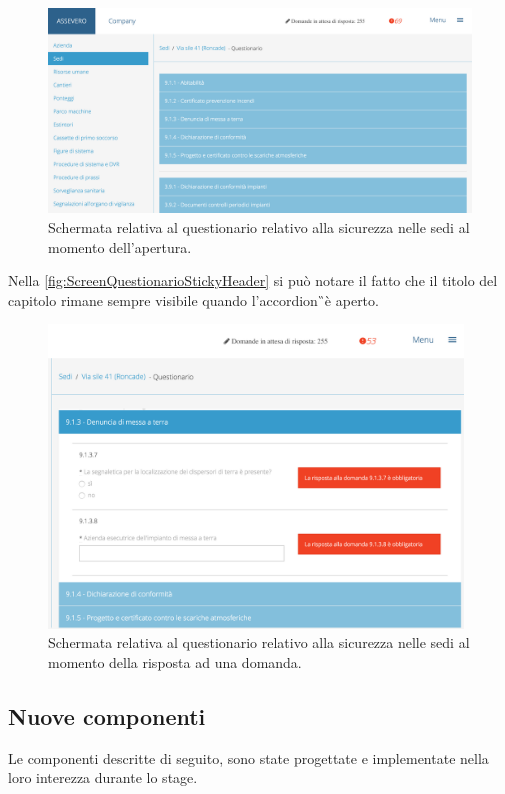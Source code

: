 \begin{figure}[H]
	\begin{center}
		\includegraphics[width=13cm]{Pics/ScreenQuestionarioSediApertura.png}
		\caption{Schermata relativa al questionario relativo alla sicurezza nelle sedi al momento dell'apertura.}
		\label{fig:ScreenQuestionarioSediApertura.png}
	\end{center}
\end{figure}
Nella \autoref{fig:ScreenQuestionarioStickyHeader} si può notare il fatto che il titolo del capitolo rimane sempre visibile quando l'\gls{accordion}\G\  è aperto.\\
\begin{figure}[H]
	\begin{center}
		\includegraphics[width=11cm]{Pics/ScreenQuestionarioStickyHeader.png}
		\caption{Schermata relativa al questionario relativo alla sicurezza nelle sedi al momento della risposta ad una domanda.}
		\label{fig:ScreenQuestionarioStickyHeader}
	\end{center}
\end{figure}

 


\newpage
\subsection{Nuove componenti}
Le componenti descritte di seguito, sono state progettate e implementate nella loro interezza durante lo stage.\\


